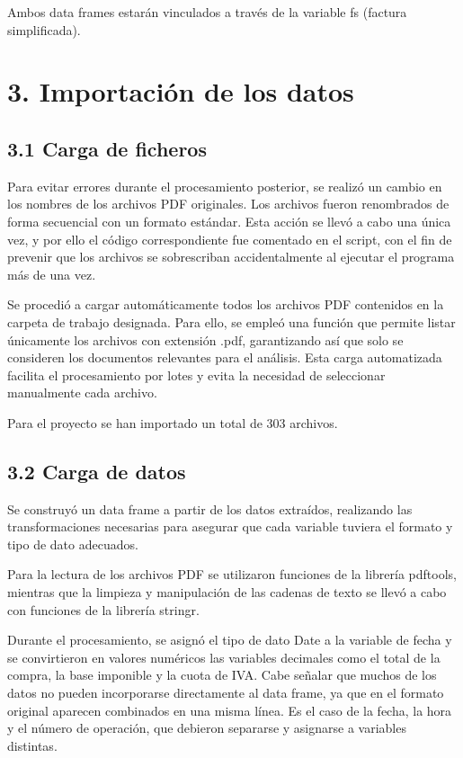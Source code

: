 \documentclass[,,,oneauthor,pdftex]{Definitions/mdpi}
\begin{document}
Ambos data frames estarán vinculados a través de la variable fs (factura
simplificada).

\hypertarget{importaciuxf3n-de-los-datos}{%
\section{3. Importación de los
datos}\label{importaciuxf3n-de-los-datos}}

\hypertarget{carga-de-ficheros}{%
\subsection{3.1 Carga de ficheros}\label{carga-de-ficheros}}

Para evitar errores durante el procesamiento posterior, se realizó un
cambio en los nombres de los archivos PDF originales. Los archivos
fueron renombrados de forma secuencial con un formato estándar. Esta
acción se llevó a cabo una única vez, y por ello el código
correspondiente fue comentado en el script, con el fin de prevenir que
los archivos se sobrescriban accidentalmente al ejecutar el programa más
de una vez.

Se procedió a cargar automáticamente todos los archivos PDF contenidos
en la carpeta de trabajo designada. Para ello, se empleó una función que
permite listar únicamente los archivos con extensión .pdf, garantizando
así que solo se consideren los documentos relevantes para el análisis.
Esta carga automatizada facilita el procesamiento por lotes y evita la
necesidad de seleccionar manualmente cada archivo.

Para el proyecto se han importado un total de 303 archivos.

\hypertarget{carga-de-datos}{%
\subsection{3.2 Carga de datos}\label{carga-de-datos}}

Se construyó un data frame a partir de los datos extraídos, realizando
las transformaciones necesarias para asegurar que cada variable tuviera
el formato y tipo de dato adecuados.

Para la lectura de los archivos PDF se utilizaron funciones de la
librería pdftools, mientras que la limpieza y manipulación de las
cadenas de texto se llevó a cabo con funciones de la librería stringr.

Durante el procesamiento, se asignó el tipo de dato Date a la variable
de fecha y se convirtieron en valores numéricos las variables decimales
como el total de la compra, la base imponible y la cuota de IVA. Cabe
señalar que muchos de los datos no pueden incorporarse directamente al
data frame, ya que en el formato original aparecen combinados en una
misma línea. Es el caso de la fecha, la hora y el número de operación,
que debieron separarse y asignarse a variables distintas.
\end{document}
